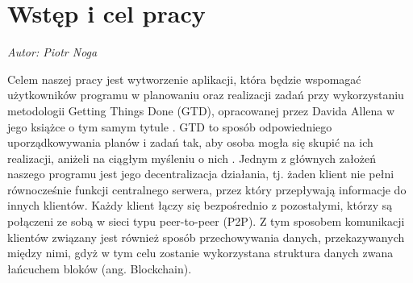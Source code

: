 \chapter{Wstęp i cel pracy}
\label{chap:wstep}
\textit{Autor: Piotr Noga}
\par Celem naszej pracy jest wytworzenie aplikacji, która będzie wspomagać użytkowników programu w planowaniu oraz realizacji zadań przy wykorzystaniu metodologii Getting Things Done (GTD), opracowanej przez Davida Allena w jego książce o tym samym tytule \cite{GTD}. GTD to sposób odpowiedniego uporządkowywania planów i zadań tak, aby osoba mogła się skupić na ich realizacji, aniżeli na ciągłym myśleniu o nich \cite{DAllInt}. Jednym z głównych założeń naszego programu jest jego decentralizacja działania, tj. żaden klient nie pełni równocześnie funkcji centralnego serwera, przez który przepływają informacje do innych klientów. Każdy klient łączy się bezpośrednio z pozostałymi, którzy są połączeni ze sobą w sieci typu peer-to-peer (P2P). Z tym sposobem komunikacji klientów związany jest również sposób przechowywania danych, przekazywanych między nimi, gdyż w tym celu zostanie wykorzystana struktura danych zwana łańcuchem bloków (ang. Blockchain).

